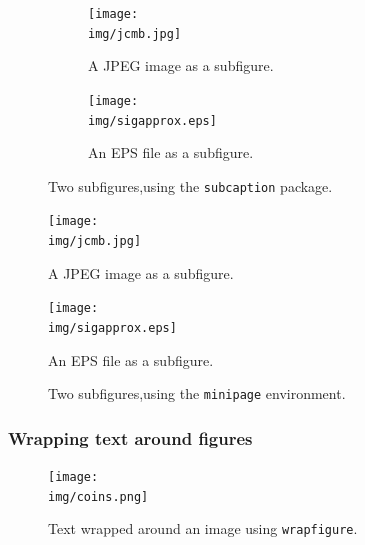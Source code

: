 \begin{figure}[H]
    \centering
    \begin{subfigure}{0.35\textwidth}
        \texttt{[image: \\img/jcmb.jpg]}
        \caption{A JPEG image as a subfigure.}
        \label{fig:jcmb}
    \end{subfigure}
    \hfill
    \begin{subfigure}{0.6\textwidth}
        \texttt{[image: \\img/sigapprox.eps]}
        \caption{An EPS file as a subfigure.}
        \label{fig:sig}
    \end{subfigure}
    \caption{Two subfigures,using the \texttt{subcaption} package.}
    \label{fig:subs}
\end{figure}



\begin{figure}[H]
    \centering
    \begin{minipage}{.35\textwidth}
        \centering
        \texttt{[image: \\img/jcmb.jpg]}
        \caption{A JPEG image as a subfigure.}
        \label{fig:mp-jcmb}
    \end{minipage}%
    \begin{minipage}{0.6\textwidth}
        \centering
        \texttt{[image: \\img/sigapprox.eps]}
        \caption{An EPS file as a subfigure.}
        \label{fig:mp-sig}
    \end{minipage}
    \caption{Two subfigures,using the \texttt{minipage} environment.}
    \label{fig:minpage}
\end{figure}


\subsubsection{Wrapping text around figures}
\label{float:wrap}

\begin{figure}
    \centering
    \texttt{[image: \\img/coins.png]}
    \caption{Text wrapped around an image using \texttt{wrapfigure}.}
    \label{fig:wrap}
\end{figure}

